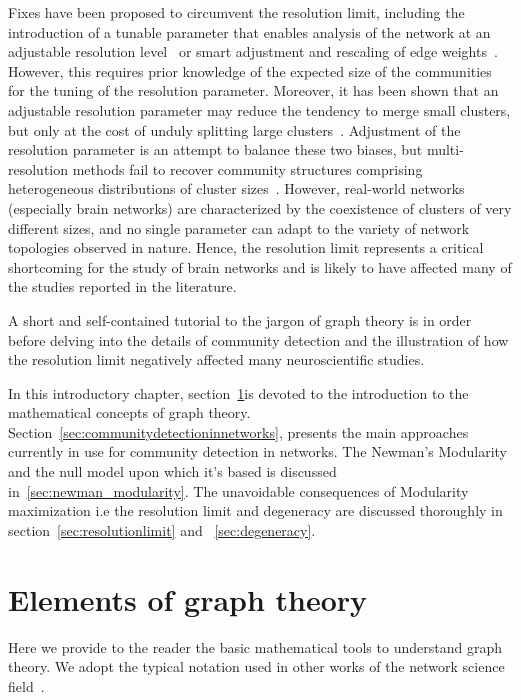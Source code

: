Fixes have been proposed to circumvent the resolution limit, including the introduction of a tunable parameter that enables analysis of the network at an adjustable resolution level~\cite{reichardt2006,ronhovde2010,yeo2011} or smart adjustment and rescaling of edge weights~\cite{berry2011}.
However, this requires prior knowledge of the expected size of the communities for the tuning of the resolution parameter. Moreover, it has been shown that an  adjustable resolution parameter may reduce the tendency to merge small clusters, but only at the cost of unduly splitting large clusters~\cite{lancichinetti2011}. Adjustment of the resolution parameter is an attempt to balance these two biases, but multi-resolution methods fail to recover community structures comprising heterogeneous distributions of cluster sizes~\cite{lancichinetti2011}. 
However, real-world networks (especially brain networks) are characterized by the coexistence of clusters of very different sizes, and no single parameter can adapt to the variety of network topologies observed in nature.
Hence, the resolution limit represents a critical shortcoming for the study of brain networks and is likely to have affected many of the studies reported in the literature.

\bigbreak
A short and self-contained tutorial to the jargon of graph theory is in order before delving into the details of community detection and the illustration of how the resolution limit negatively affected many neuroscientific studies.

In this introductory chapter, section~\ref{sec:elementsofgraphtheory}is devoted to the introduction to the mathematical concepts of graph theory. Section~\ref{sec:communitydetectioninnetworks}, presents the main approaches currently in use for community detection in networks. The Newman's Modularity and the null model upon which it's based is discussed in~\ref{sec:newman_modularity}.
The unavoidable consequences of Modularity maximization i.e the resolution limit and degeneracy are discussed thoroughly in section~\ref{sec:resolutionlimit} and ~\ref{sec:degeneracy}.


\section{Elements of graph theory}\label{sec:elementsofgraphtheory}
Here we provide to the reader the basic mathematical tools to understand graph theory. We adopt the typical notation used in other works of the network science field~\cite{newman2010book,estrada2011}.


